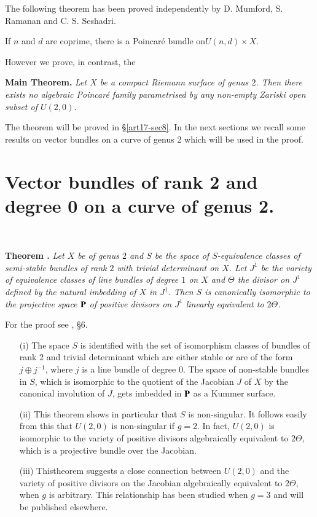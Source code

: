 The following theorem has been proved independently by D. Mumford, S. Ramanan and C. S. Seshadri.

\begin{theorem*}
If $n$ and $d$ are coprime, there is a Poincar\'e bundle on\break $U(n,d)\times X$.
\end{theorem*}

However we prove, in contrast, the 

\noindent
{\bf Main Theorem.}
{\em Let $X$ be a compact Riemann surface of genus $2$. Then there exists no algebraic Poincar\'e family parametrised by any non-empty Zariski open subset of $U(2,0)$.}
\smallskip

The theorem will be proved in \S\ref{art17-sec8}. In the next sections we recall some results on vector bundles on a curve of genus 2 which will be used in the proof.

\section{Vector bundles of rank 2 and degree 0 on a curve of genus 2.}\label{art17-sec4}

~
\medskip

\noindent
{\bf Theorem .\label{art17-thm4.1}}
{\em Let $X$ be of genus $2$ and $S$ be the space of $S$-equivalence classes of semi-stable bundles of rank $2$ with trivial determinant on $X$. Let $J^{1}$ be the variety of equivalence classes of line bundles of degree $1$ on $X$ and $\Theta$ the divisor on $J^{1}$ defined by the natural imbedding of $X$ in $J^{1}$. Then $S$ is canonically isomorphic to the projective space $\mathbf{P}$ of positive divisors on $J^{1}$ linearly equivalent to $2\Theta$.}
\smallskip

For the proof see \cite{art17-key3}, \S6.

\begin{remarks*}
\begin{itemize}
\item[(i)] The space $S$ is identified with the set of isomorphism classes of bundles of rank 2 and trivial determinant which are either stable or are of the form $j\oplus j^{-1}$, where $j$ is a line bundle of degree $0$. The space of non-stable bundles in $S$, which is isomorphic to the quotient of the Jacobian $J$ of $X$ by the canonical involution of $J$, gets imbedded in $\mathbf{P}$ as a Kummer surface.

\item[(ii)] This theorem shows in particular that $S$ is non-singular. It follows easily from this that $U(2,0)$ is non-singular if $g=2$. In fact, $U(2,0)$ is isomorphic to the variety of positive divisors algebraically equivalent to $2\Theta$, which is a projective bundle over the Jacobian.

\item[(iii)] This\pageoriginale theorem suggests a close connection between $U(2,0)$ and the variety of positive divisors on the Jacobian algebraically equivalent to $2\Theta$, when $g$ is arbitrary. This relationship has been studied when $g=3$ and will be published elsewhere.
\end{itemize}
\end{remarks*}

